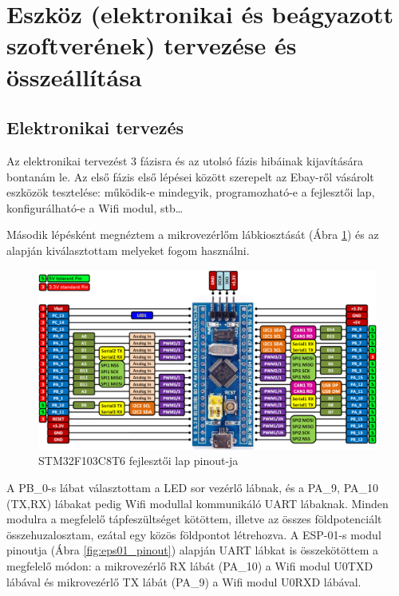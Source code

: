 \documentclass[../main.tex]{subfiles}
\begin{document}
\section{Eszköz (elektronikai és beágyazott szoftverének) tervezése és összeállítása}
    \subsection{Elektronikai tervezés}
        Az elektronikai tervezést 3 fázisra és az utolsó fázis hibáinak kijavítására bontanám le. Az első fázis első lépései között szerepelt az Ebay-ről vásárolt eszközök tesztelése: működik-e mindegyik, programozható-e a fejlesztői lap, konfigurálható-e a Wifi modul, stb\ldots
        
        Második lépésként megnéztem a mikrovezérlőm lábkiosztását (Ábra \ref{fig:stm32f103_pinout}) és az alapján kiválasztottam melyeket fogom használni. 
        
        \begin{figure}[h!]
            \centering
                \includegraphics[width=14cm]{resources/pcb_res/stm32f103c8t6_pinout.png}
            \caption{STM32F103C8T6 fejlesztői lap pinout-ja}
            \label{fig:stm32f103_pinout}
        \end{figure}
        
        A PB\_0-s lábat választottam a LED sor vezérlő lábnak, és a PA\_9, PA\_10 (TX,RX) lábakat pedig Wifi modullal kommunikáló UART lábaknak. Minden modulra a megfelelő tápfeszültséget kötöttem, illetve az összes földpotenciált összehuzalosztam, ezátal egy közös földpontot létrehozva. A ESP-01-s modul pinoutja (Ábra \ref{fig:eps01_pinout}) alapján UART lábkat is összekötöttem a megfelelő módon: a mikrovezérlő RX lábát (PA\_10) a Wifi modul U0TXD lábával és mikrovezérlő TX lábát (PA\_9) a Wifi modul U0RXD lábával. 
        
\end{document}
